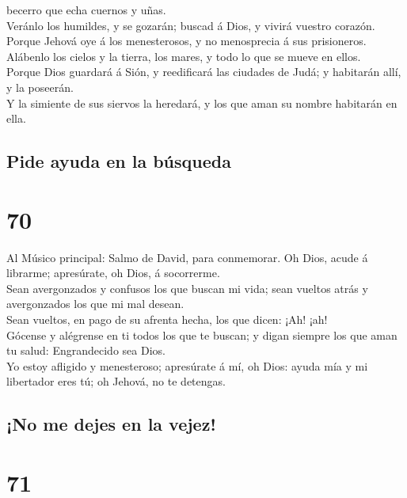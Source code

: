 becerro que echa cuernos y uñas.\\
 Veránlo los humildes, y se gozarán; buscad á Dios, y
vivirá vuestro corazón.\\
 Porque Jehová oye á los menesterosos, y no menosprecia á
sus prisioneros.\\
 Alábenlo los cielos y la tierra, los mares, y todo lo
que se mueve en ellos.\\
 Porque Dios guardará á Sión, y reedificará las ciudades
de Judá; y habitarán allí, y la poseerán.\\
 Y la simiente de sus siervos la heredará, y los que aman
su nombre habitarán en ella.

\hypertarget{pide-ayuda-en-la-buxfasqueda}{%
\subsection{Pide ayuda en la
búsqueda}\label{pide-ayuda-en-la-buxfasqueda}}

\hypertarget{section-69}{%
\section{70}\label{section-69}}

 Al Músico principal: Salmo de David, para conmemorar. Oh
Dios, acude á librarme; apresúrate, oh Dios, á socorrerme.\\
 Sean avergonzados y confusos los que buscan mi vida; sean
vueltos atrás y avergonzados los que mi mal desean.\\
 Sean vueltos, en pago de su afrenta hecha, los que dicen:
¡Ah! ¡ah!\\
 Gócense y alégrense en ti todos los que te buscan; y
digan siempre los que aman tu salud: Engrandecido sea Dios.\\
 Yo estoy afligido y menesteroso; apresúrate á mí, oh
Dios: ayuda mía y mi libertador eres tú; oh Jehová, no te detengas.

\hypertarget{no-me-dejes-en-la-vejez}{%
\subsection{¡No me dejes en la vejez!}\label{no-me-dejes-en-la-vejez}}

\hypertarget{section-70}{%
\section{71}\label{section-70}}

